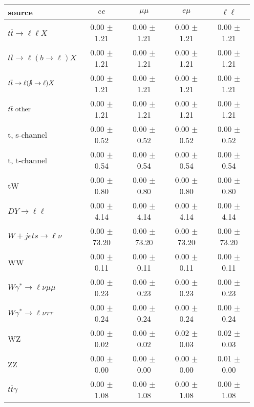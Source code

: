\begin{tabular}{l|cccc} \hline\hline
source & $ee$ & $\mu\mu$ & $e\mu$ & $\ell\ell $ \\
\hline
$t\overline{t} \rightarrow \ell \ell X$ &  0.00 $\pm$  1.21 &  0.00 $\pm$  1.21 &  0.00 $\pm$  1.21 &  0.00 $\pm$  1.21 \\
$t\overline{t} \rightarrow \ell (b \rightarrow \ell) X$ &  0.00 $\pm$  1.21 &  0.00 $\pm$  1.21 &  0.00 $\pm$  1.21 &  0.00 $\pm$  1.21 \\
$t\overline{t} \rightarrow \ell (\slashed b \rightarrow \ell) X$ &  0.00 $\pm$  1.21 &  0.00 $\pm$  1.21 &  0.00 $\pm$  1.21 &  0.00 $\pm$  1.21 \\
        $t\overline{t}\ \rm{other}$ &  0.00 $\pm$  1.21 &  0.00 $\pm$  1.21 &  0.00 $\pm$  1.21 &  0.00 $\pm$  1.21 \\
\hline
                       t, s-channel &  0.00 $\pm$  0.52 &  0.00 $\pm$  0.52 &  0.00 $\pm$  0.52 &  0.00 $\pm$  0.52 \\
                       t, t-channel &  0.00 $\pm$  0.54 &  0.00 $\pm$  0.54 &  0.00 $\pm$  0.54 &  0.00 $\pm$  0.54 \\
                                 tW &  0.00 $\pm$  0.80 &  0.00 $\pm$  0.80 &  0.00 $\pm$  0.80 &  0.00 $\pm$  0.80 \\
\hline
         $DY \rightarrow \ell \ell$ &  0.00 $\pm$  4.14 &  0.00 $\pm$  4.14 &  0.00 $\pm$  4.14 &  0.00 $\pm$  4.14 \\
      $W+jets \rightarrow \ell \nu$ &  0.00 $\pm$ 73.20 &  0.00 $\pm$ 73.20 &  0.00 $\pm$ 73.20 &  0.00 $\pm$ 73.20 \\
                                 WW &  0.00 $\pm$  0.11 &  0.00 $\pm$  0.11 &  0.00 $\pm$  0.11 &  0.00 $\pm$  0.11 \\
\hline
$W\gamma^{*} \rightarrow \ell \nu \mu\mu$ &  0.00 $\pm$  0.23 &  0.00 $\pm$  0.23 &  0.00 $\pm$  0.23 &  0.00 $\pm$  0.23 \\
$W\gamma^{*} \rightarrow \ell \nu \tau\tau$ &  0.00 $\pm$  0.24 &  0.00 $\pm$  0.24 &  0.00 $\pm$  0.24 &  0.00 $\pm$  0.24 \\
                                 WZ &  0.00 $\pm$  0.02 &  0.00 $\pm$  0.02 &  0.02 $\pm$  0.03 &  0.02 $\pm$  0.03 \\
                                 ZZ &  0.00 $\pm$  0.00 &  0.00 $\pm$  0.00 &  0.00 $\pm$  0.00 &  0.01 $\pm$  0.00 \\
\hline
              $t\overline{t}\gamma$ &  0.00 $\pm$  1.08 &  0.00 $\pm$  1.08 &  0.00 $\pm$  1.08 &  0.00 $\pm$  1.08 \\

\end{tabular}
